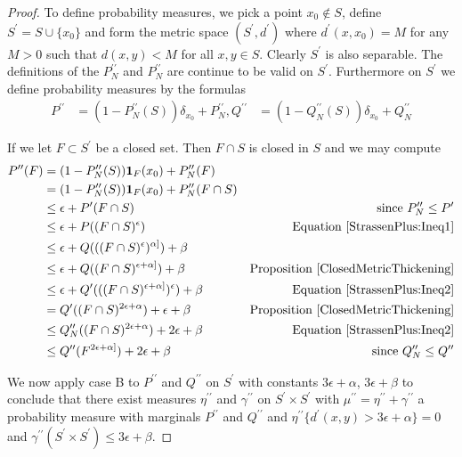 \begin{proof}
To define probability measures, we pick a point $x_0 \notin S$, define $S^\prime = S \cup  \lbrace x_0 \rbrace$ and form the metric space $(S^\prime, d^\prime)$ where $d^\prime(x,x_0) = M$ for any $M>0$ such that $d(x,y) < M$ for all $x,y \in S$.  Clearly $S^\prime$ is also separable.  The definitions of the $P^{\prime \prime}_N$ and $P^{\prime \prime}_N$ are continue to be valid on $S^\prime$. Furthermore on $S^\prime$ we define probability measures by the formulas
\begin{align*}
P^{\prime \prime} &= (1 - P^{\prime \prime}_N (S)) \delta_{x_0} +  P^{\prime \prime}_N, Q^{\prime \prime} &= (1 - Q^{\prime \prime}_N (S)) \delta_{x_0} +  Q^{\prime \prime}_N
\end{align*}

If we let $F \subset S^\prime$ be a closed set.  Then $F \cap S$ is closed in $S$ and we may compute
\begin{align*}
P^{\prime \prime}(F) &= (1 - P^{\prime \prime}_N (S)) \textbf{1}_{F}(x_0) + P^{\prime \prime}_N(F) \\
&= (1 - P^{\prime \prime}_N (S)) \textbf{1}_{F}(x_0) + P^{\prime \prime}_N(F \cap S) \\
&\leq \epsilon + P^{\prime}(F \cap S)  & \text{since $P_N^{\prime \prime} \leq P^\prime$}\\
&\leq \epsilon + P((F \cap S)^\epsilon)  & \text{Equation \eqref{StrassenPlus:Ineq1}}\\
&\leq \epsilon + Q(((F \cap S)^\epsilon)^{\alpha]}) + \beta \\
&\leq \epsilon + Q((F \cap S)^{\epsilon+\alpha]}) + \beta & \text{Proposition \ref{ClosedMetricThickening}} \\
&\leq \epsilon + Q^\prime(((F \cap S)^{\epsilon+\alpha]})^\epsilon) + \beta & \text{Equation \eqref{StrassenPlus:Ineq2}} \\
&= Q^\prime((F \cap S)^{2\epsilon+\alpha}) + \epsilon + \beta & \text{Proposition \ref{ClosedMetricThickening}} \\
&\leq Q_N^{\prime \prime} ((F \cap S)^{2\epsilon+\alpha}) + 2\epsilon + \beta & \text{Equation \eqref{StrassenPlus:Ineq2}}  \\
&\leq Q^{\prime \prime} (F^{2\epsilon+\alpha]}) + 2\epsilon + \beta & \text{since $Q_N^{\prime \prime} \leq Q^{\prime \prime}$} 
\end{align*}

We now apply case B to $P^{\prime \prime}$ and $Q^{\prime \prime}$ on $S^\prime$ with constants $3\epsilon + \alpha$, $3\epsilon + \beta$ to conclude that there
exist measures $\eta^{\prime \prime}$ and $\gamma^{\prime \prime}$ on $S^\prime \times S^\prime$ with $\mu^{\prime \prime}= \eta^{\prime \prime} + \gamma^{\prime \prime}$ a 
probability measure with marginals $P^{\prime \prime}$ and $Q^{\prime \prime}$ and $\eta^{\prime \prime} \lbrace d^\prime(x,y) > 3\epsilon + \alpha \rbrace = 0$ and 
$\gamma^{\prime \prime}(S^\prime \times S^{\prime}) \leq 3\epsilon + \beta$.


\end{proof}
